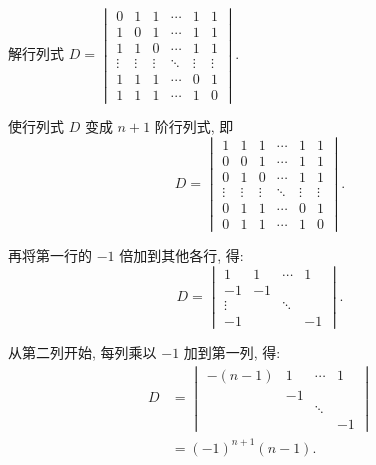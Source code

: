 \begin{example}{}{}
    解行列式 $D=\begin{vmatrix}
            0      & 1      & 1      & \cdots & 1      & 1      \\
            1      & 0      & 1      & \cdots & 1      & 1      \\
            1      & 1      & 0      & \cdots & 1      & 1      \\
            \vdots & \vdots & \vdots & \ddots & \vdots & \vdots \\
            1      & 1      & 1      & \cdots & 0      & 1      \\
            1      & 1      & 1      & \cdots & 1      & 0
        \end{vmatrix}$.
\end{example}

\begin{solution}
    使行列式 $D$ 变成 $n+1$ 阶行列式, 即
    \[ D=\begin{vmatrix}
            1      & 1      & 1      & \cdots & 1      & 1      \\
            0      & 0      & 1      & \cdots & 1      & 1      \\
            0      & 1      & 0      & \cdots & 1      & 1      \\
            \vdots & \vdots & \vdots & \ddots & \vdots & \vdots \\
            0      & 1      & 1      & \cdots & 0      & 1      \\
            0      & 1      & 1      & \cdots & 1      & 0
        \end{vmatrix}. \]

    再将第一行的 $-1$ 倍加到其他各行, 得:
    \[ D =\begin{vmatrix}
            1      & 1  & \cdots & 1  \\
            -1     & -1 &        &    \\
            \vdots &    & \ddots &    \\
            -1     &    &        & -1
        \end{vmatrix}. \]

    从第二列开始, 每列乘以 $-1$ 加到第一列, 得:
    \begin{align*}
        D & =\begin{vmatrix}
                 -(n-1) & 1  & \cdots & 1  \\
                        & -1 &        &    \\
                        &    & \ddots &    \\
                        &    &        & -1
             \end{vmatrix} \\
          & =(-1)^{n+1}(n-1).
    \end{align*}
\end{solution}

